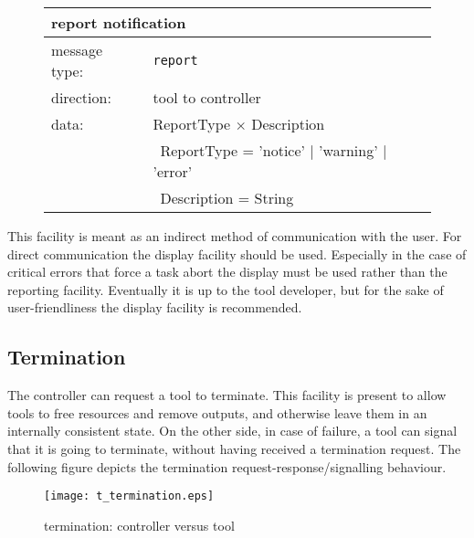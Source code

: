 \documentclass{article}
\newcommand{\msg}[1]{\texttt{#1}}
\begin{document}
   \begin{figure}[H]
    \begin{center}
     \begin{tabular}{|ll|}
      \hline
       \multicolumn{2}{|l|}{\textbf{report notification}} \\
      \hline
       message type:   & \msg{report} \\
      \hline
       direction:      & tool to controller \\
       data:           & ReportType $\times$ Description \\
                       & \ ReportType = 'notice' $|$ 'warning' $|$ 'error' \\
                       & \ Description = String \\
      \hline
     \end{tabular}
    \end{center}
   \end{figure}
   \vspace{-0.3cm}

   \noindent This facility is meant as an indirect method of communication with
   the user.  For direct communication the display facility should be used.
   Especially in the case of critical errors that force a task abort the
   display must be used rather than the reporting facility. Eventually it is up
   to the tool developer, but for the sake of user-friendliness the display
   facility is recommended.

  \subsection{Termination}

   The controller can request a tool to terminate. This facility is present to
   allow tools to free resources and remove outputs, and otherwise leave them
   in an internally consistent state. On the other side, in case of failure, a
   tool can signal that it is going to terminate, without having received a
   termination request. The following figure depicts the termination
   request-response/signalling behaviour.

   \begin{figure}[H]
    \begin{center}
     \texttt{[image: t\_termination.eps]}
    \end{center}
    \vspace{-0.3cm}
    \caption{termination: controller versus tool}
   \end{figure}
\end{document}
